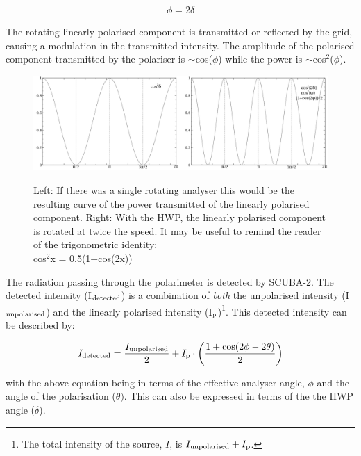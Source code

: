 \begin{equation}
\phi = 2 \delta
\end{equation}


The rotating linearly polarised component is transmitted or reflected
by the grid, causing a modulation in the transmitted intensity.
The amplitude of the polarised component transmitted by the polariser is
$\sim$cos($\phi$) while the power is $\sim$cos$^{2}$($\phi$).

\begin{figure}[t!]
\begin{center}
\includegraphics[width=0.95\linewidth]{hwp-modulation-basic.png}
\label{fig:hwp-modulation-basic}
\caption [Modulation by the HWP - basic description]{ Left: If there
  was a single rotating analyser this would be the resulting curve of
  the power transmitted of the linearly polarised component.
  Right: With the HWP, the linearly polarised component is
  rotated at twice the speed. It may be useful to remind the reader of
  the trigonometric identity: \\ cos$^{2}$x = 0.5(1+cos(2x))}
\end{center}
\end{figure}


The radiation passing through the polarimeter is detected by
SCUBA-2. The detected intensity (I$_{\textnormal{detected}}$) is a combination of
\emph{both} the unpolarised intensity (I$_{\textnormal{unpolarised}}$) and the
linearly polarised intensity (I$_{\textnormal{p}}$)\footnote{The total intensity of
the source, $I$, is $I_{\textnormal{unpolarised}} + I_{\textnormal{p}}$.}. This detected intensity can be
described by:

\begin{equation}
I_{\textnormal{detected}} = \frac{I_{\textnormal{unpolarised}}}{2}+ I_{\textnormal{p}}\cdot\left(\frac{1+\cos(2\phi - 2\theta)}{2} \right)
\end{equation}

with the above equation being in terms of the effective analyser
angle, $\phi$ and the angle of the polarisation ($\theta)$.
This can also be expressed in terms of the  the HWP angle ($\delta$).

